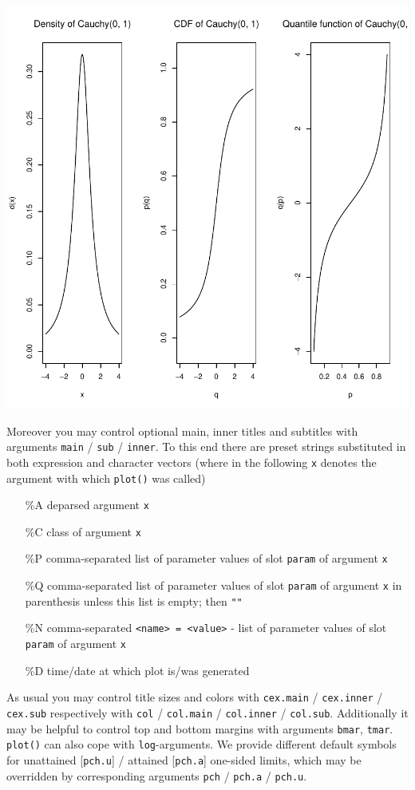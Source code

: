 \documentclass[11pt]{article}
\newcommand{\code}[1]{{\tt #1}}
\begin{document}
\includegraphics{distr-cauchy2}

Moreover you may control optional main, inner titles and subtitles with
arguments \code{main} / \code{sub} / \code{inner}. To this end there are
preset strings substituted in both expression and character vectors
(where in the following \code{x} denotes the argument
with which \code{plot()} was called)
\begin{itemize}
 \item[\%A] deparsed argument \code{x}
 \item[\%C] class of argument \code{x}
 \item[\%P] comma-separated list of parameter values of slot \code{param} of
            argument \code{x}
 \item[\%Q] comma-separated list of parameter values of slot \code{param} of
            argument \code{x} in parenthesis unless this list is empty; then
            \code{""}
 \item[\%N] comma-separated {\tt <name> = <value>} - list of parameter values of
            slot \code{param} of argument \code{x}
 \item[\%D] time/date at which plot is/was generated
\end{itemize}
As usual you may control title sizes and colors with
\code{cex.main} / \code{cex.inner} / \code{cex.sub} respectively with
\code{col} / \code{col.main} / \code{col.inner} / \code{col.sub}. Additionally
it may be helpful to control top and bottom margins with arguments
\code{bmar}, \code{tmar}. \code{plot()} can also cope with \code{log}-arguments.
We provide different default symbols for unattained [\code{pch.u}] / attained
[\code{pch.a}] one-sided limits, which may be overridden by corresponding
arguments  \code{pch} / \code{pch.a} / \code{pch.u}.
\end{document}
